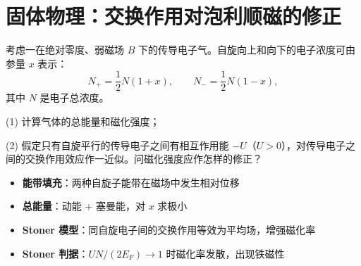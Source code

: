 \section{固体物理：交换作用对泡利顺磁的修正}
\label{sec:stoner-correction}

\begin{modelbox}
考虑一在绝对零度、弱磁场 $B$ 下的传导电子气。自旋向上和向下的电子浓度可由参量 $x$ 表示：
\begin{equation*}
N_+=\frac{1}{2}N(1+x),\qquad N_-=\frac{1}{2}N(1-x),
\end{equation*}
其中 $N$ 是电子总浓度。

(1) 计算气体的总能量和磁化强度；

(2) 假定只有自旋平行的传导电子之间有相互作用能 $-U$（$U>0$），对传导电子之间的交换作用效应作一近似。问磁化强度应作怎样的修正？
\end{modelbox}

\begin{tipbox}[考点快速分析]
\begin{itemize}
    \item \textbf{能带填充}：两种自旋子能带在磁场中发生相对位移
    \item \textbf{总能量}：动能 + 塞曼能，对 $x$ 求极小
    \item \textbf{Stoner 模型}：同自旋电子间的交换作用等效为平均场，增强磁化率
    \item \textbf{Stoner 判据}：$UN/(2E_F)\to1$ 时磁化率发散，出现铁磁性
\end{itemize}
\end{tipbox}

